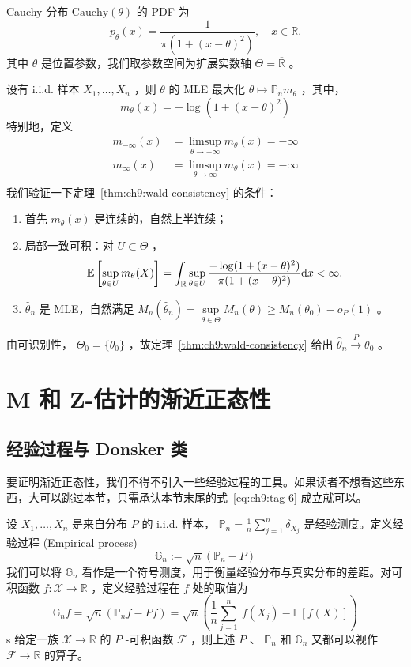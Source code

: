 \begin{example}[Cauchy 似然]
Cauchy 分布 $\text{Cauchy}(\theta)$ 的 PDF 为
\[
p_\theta(x)=\frac1{\pi(1+(x-\theta)^2)},\quad x\in\mathbb R.
\]
其中 $\theta$ 是位置参数，我们取参数空间为扩展实数轴 $\Theta=\overline{\mathbb R}$ 。

设有 i.i.d. 样本 $X_1,\dots,X_n$ ，则 $\theta$ 的 MLE 最大化 $\theta\mapsto\mathbb P_nm_\theta$ ，其中， 
$$m_\theta(x)=-\log(1+(x-\theta)^2)$$
特别地，定义\[\begin{aligned} m_{-\infty}(x)&=\limsup_{\theta\to-\infty}m_\theta(x)=-\infty\\ m_{\infty}(x)&=\limsup_{\theta\to\infty}m_\theta(x)=-\infty\\  \end{aligned}\]
我们验证一下定理~\ref{thm:ch9:wald-consistency} 的条件：

\begin{enumerate}
\def\labelenumi{\arabic{enumi}.}
\tightlist
\item
  首先 $m_\theta(x)$ 是连续的，自然上半连续；
\item
  局部一致可积：对 $U\subset \Theta$ ，
  \[
  \mathbb E\left[\sup_{\theta\in U}m_\theta(X)\right]=\int_{\mathbb R}\sup_{\theta\in U}\frac{-\log(1+(x-\theta)^2)}{\pi(1+(x-\theta)^2)}{\rm d}x<\infty.
  \]
\item
  $\widehat\theta_n$ 是 MLE，自然满足 $M_n(\widehat\theta_n)=\sup\limits_{\theta\in\Theta}M_n(\theta)\ge M_n(\theta_0)-o_P(1)$ 。
\end{enumerate}
由可识别性， $\Theta_0=\{\theta_0\}$ ，故定理~\ref{thm:ch9:wald-consistency} 给出 $\widehat\theta_n\overset P\to \theta_0$ 。


\end{example}

\section{M 和 Z-估计的渐近正态性}

\subsection{经验过程与 Donsker 类}

要证明渐近正态性，我们不得不引入一些经验过程的工具。如果读者不想看这些东西，大可以跳过本节，只需承认本节末尾的式~\eqref{eq:ch9:tag-6} 成立就可以。

设 $X_1,\dots,X_n$ 是来自分布 $P$ 的 i.i.d. 样本， $\mathbb P_n=\frac1n\sum_{j=1}^n\delta_{X_j}$ 是经验测度。定义\href{https://en.wikipedia.org/wiki/Empirical_process}{经验过程} (Empirical process)\[\mathbb G_n:=\sqrt n(\mathbb P_n-P)\]
我们可以将 $\mathbb G_n$ 看作是一个符号测度，用于衡量经验分布与真实分布的差距。对可积函数 $f:\mathscr X\to\mathbb R$ ，定义经验过程在 $f$ 处的取值为 
$$\mathbb G_nf=\sqrt n(\mathbb P_nf-Pf)=\sqrt n\left(\frac1n\sum_{j=1}^n\ f(X_j)-\mathbb E[f(X)]\right)$$s
给定一族 $\mathscr X\to \mathbb R$ 的 $P$ -可积函数 $\mathscr F$ ，则上述 $P$ 、 $\mathbb P_n$ 和 $\mathbb G_n$ 又都可以视作 $\mathscr F\to \mathbb R$ 的算子。

